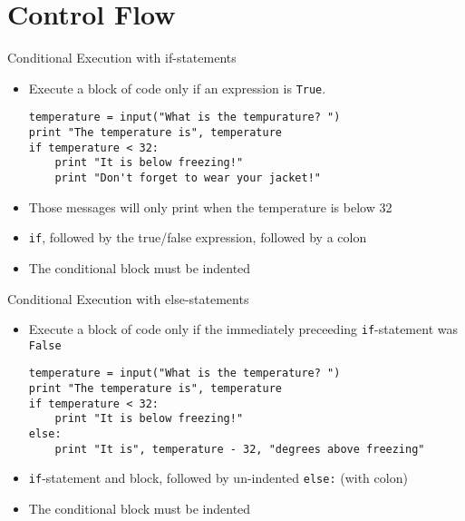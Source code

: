 \section{Control Flow}

\begin{frame}[fragile]{Conditional Execution with {\ttfamily if}-statements}
  \begin{itemize}
    \item Execute a block of code only if an expression is \texttt{True}.
\begin{lstlisting}
temperature = input("What is the tempurature? ")
print "The temperature is", temperature
if temperature < 32:
    print "It is below freezing!"
    print "Don't forget to wear your jacket!"
\end{lstlisting}
\item Those messages will only print when the temperature is below 32
\item \texttt{if}, followed by the true/false expression, followed by a colon
\item The conditional block must be indented
  \end{itemize}
\end{frame}

\begin{frame}[fragile]{Conditional Execution with {\ttfamily else}-statements}
  \begin{itemize}
    \item Execute a block of code only if the immediately preceeding \texttt{if}-statement was \texttt{False}
\begin{lstlisting}
temperature = input("What is the temperature? ")
print "The temperature is", temperature
if temperature < 32:
    print "It is below freezing!"
else:
    print "It is", temperature - 32, "degrees above freezing"
\end{lstlisting}
\item \texttt{if}-statement and block, followed by un-indented \texttt{else:} (with colon)
\item The conditional block must be indented
  \end{itemize}
\end{frame}

\pagebreak

